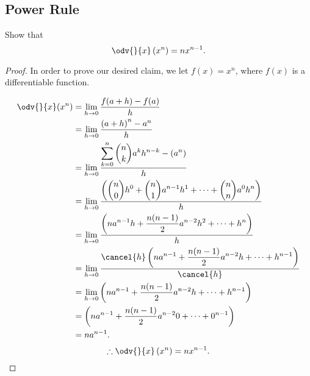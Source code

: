 \subsection{Power Rule}

Show that
\[%
  \odv{}{x}\left(x^{n}\right) = nx^{n - 1}
.\]%

\begin{proof}
  In order to prove our desired claim, we let $f(x) = x^{n}$, where $f(x)$ is a
  differentiable function.

  \begin{align*}
    \odv{}{x}(x^{n}) &= \lim_{h \to 0} \frac{f(a + h) - f(a)}{h} \\
                     &= \lim_{h \to 0} \frac{\left(a + h\right)^{n} - a^{n}}{h} \\
                     &= \lim_{h \to 0} \frac{\displaystyle\sum_{k=0}^{n} {n \choose k} a^{k}h^{n - k} - \left(a^{n}\right)}{h} \\
                     &=\lim_{h \to 0} \frac{\displaystyle\left({n \choose 0}h^{0} + {n \choose 1}a^{n-1}h^{1} + \cdots + {n \choose n}a^{0}h^{n}\right)}{h} \\
                     &=\lim_{h \to 0} \frac{\displaystyle\left(na^{n-1}h + \frac{n(n-1)}{2}a^{n-2}h^{2} + \cdots + h^{n}\right)}{h} \\
                     &=\lim_{h \to 0} \frac{\displaystyle\cancel{h}\left(na^{n-1} + \frac{n(n-1)}{2}a^{n-2}h + \cdots + h^{n-1}\right)}{\cancel{h}} \\
                     &=\lim_{h \to 0} \left(na^{n-1} + \frac{n(n-1)}{2}a^{n-2}h + \cdots + h^{n-1} \right) \\
                     &=\left(na^{n-1} + \frac{n(n-1)}{2}a^{n-2}0 + \cdots + 0^{n-1}\right) \\
                     &=na^{n-1}
  .\end{align*}
  \[%
    \therefore \odv{}{x}\left(x^{n}\right) = nx^{n-1}
  .\]%
\end{proof}
